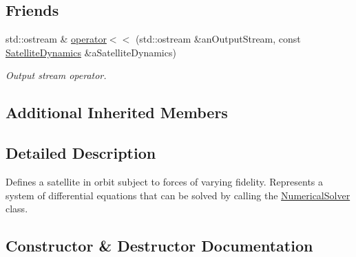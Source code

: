 \subsection*{Friends}
\begin{DoxyCompactItemize}
\item 
std\+::ostream \& \hyperlink{classostk_1_1astro_1_1flight_1_1system_1_1dynamics_1_1_satellite_dynamics_a26dfc3296b117e4887b254e5746b51bb}{operator$<$$<$} (std\+::ostream \&an\+Output\+Stream, const \hyperlink{classostk_1_1astro_1_1flight_1_1system_1_1dynamics_1_1_satellite_dynamics}{Satellite\+Dynamics} \&a\+Satellite\+Dynamics)
\begin{DoxyCompactList}\small\item\em Output stream operator. \end{DoxyCompactList}\end{DoxyCompactItemize}
\subsection*{Additional Inherited Members}


\subsection{Detailed Description}
Defines a satellite in orbit subject to forces of varying fidelity. Represents a system of differential equations that can be solved by calling the \hyperlink{classostk_1_1astro_1_1_numerical_solver}{Numerical\+Solver} class. 

\subsection{Constructor \& Destructor Documentation}
\mbox{\label{classostk_1_1astro_1_1flight_1_1system_1_1dynamics_1_1_satellite_dynamics_a756ced12a03832285a4a0fa89b0b8085}} 
